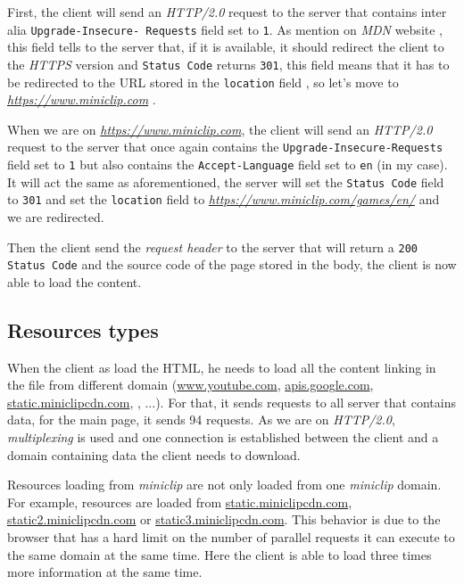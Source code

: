 \documentclass{article}
\newcommand{\link}[1]{\href{#1}{\textit{#1}}}
\begin{document}
First, the client will send an \textit{HTTP/2.0} request to the server that contains inter alia \texttt{Upgrade-Insecure- Requests} field set to \texttt{1}. As mention on \textit{MDN} website \cite{upgrade-insecure-request}, this field tells to the server that, if it is available, it should redirect the client to the \textit{HTTPS} version and \texttt{Status Code} returns \texttt{301}, this field means that it has to be redirected to the URL stored in the \texttt{location} field \cite{status-code-301}, so let's move to \link{https://www.miniclip.com} .

When we are on \link{https://www.miniclip.com}, the client will send an \textit{HTTP/2.0} request to the server that once again contains the \texttt{Upgrade-Insecure-Requests} field set to \texttt{1} but also contains the \texttt{Accept-Language} field set to \texttt{en} (in my case). It will act the same as aforementioned, the server will set the \texttt{Status Code} field to \texttt{301} and set the \texttt{location} field to \link{https://www.miniclip.com/games/en/} and we are redirected.

Then the client send the \textit{request header} to the server that will return a \texttt{200 Status Code} and the
source code of the page stored in the body, the client is now able to load the content.

\subsection{Resources types}
\label{sub:res}

When the client as load the HTML, he needs to load all the content linking in the file from different domain (\url{www.youtube.com}, \url{apis.google.com}, \url{static.miniclipcdn.com}, , ...). For that, it sends requests to all server that contains data, for the main page, it sends 94 requests. As we are on \textit{HTTP/2.0}, \textit{multiplexing} is used and one connection is established between the client and a domain containing data the client needs to download.

Resources loading from \textit{miniclip} are not only loaded from one \textit{miniclip} domain. For example, resources are loaded from \url{static.miniclipcdn.com}, \url{static2.miniclipcdn.com} or \url{static3.miniclipcdn.com}. This behavior is due to the browser that has a hard limit on the number of parallel requests it can execute to the same domain at the same time. Here the client is able to load three times more information at the same time.
\end{document}
